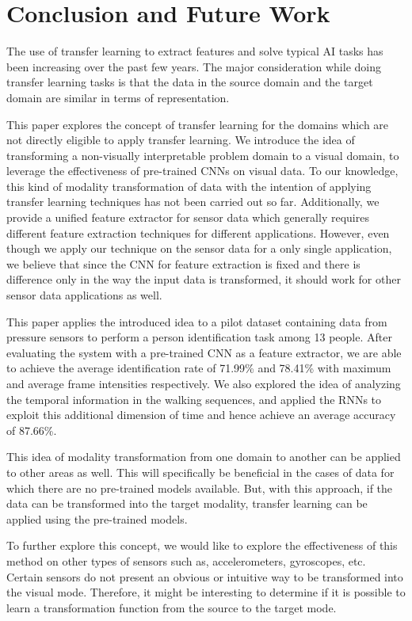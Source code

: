 \section{Conclusion and Future Work}

The use of transfer learning to extract features and solve typical AI tasks has been increasing over the past few years. The major consideration while doing transfer learning tasks is that the data in the source domain and the target domain are similar in terms of representation.

This paper explores the concept of transfer learning for the domains which are not directly eligible to apply transfer learning. We introduce the idea of transforming a non-visually interpretable problem domain to a visual domain, to leverage the effectiveness of pre-trained CNNs on visual data. To our knowledge, this kind of modality transformation of data with the intention of applying transfer learning techniques has not been carried out so far.
Additionally, we provide a unified feature extractor for sensor data which generally requires different feature extraction techniques for different applications. However, even though we apply our technique on the sensor data for a only single application, we believe that since the CNN for feature extraction is fixed and there is difference only in the way the input data is transformed, it should work for other sensor data applications as well.


This paper applies the introduced idea to a pilot dataset containing data from pressure sensors to perform a person identification task among 13 people. After evaluating the system with a pre-trained CNN as a feature extractor, we are able to achieve the average identification rate of 71.99\% and 78.41\% with maximum and average frame intensities respectively. We also explored the idea of analyzing the temporal information in the walking sequences, and applied the RNNs to exploit this additional dimension of time and hence achieve an average accuracy of 87.66\%.

This idea of modality transformation from one domain to another can be applied to other areas as well. This will specifically be beneficial in the cases of data for which there are no pre-trained models available. But, with this approach, if the data can be transformed into the target modality, transfer learning can be applied using the pre-trained models.


To further explore this concept, we would like to explore the effectiveness of this method on other types of sensors such as, accelerometers, gyroscopes, etc. Certain sensors do not present an obvious or intuitive way to be transformed into the visual mode. Therefore, it might be interesting to determine if it is possible to learn a transformation function from the source to the target mode. 